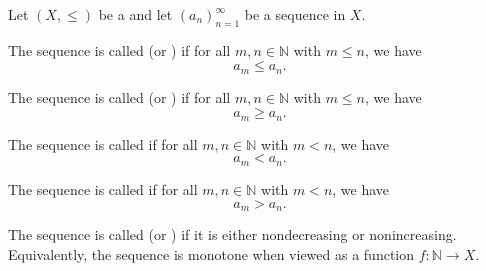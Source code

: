 \begin{definition} \label{definition:monotone_sequence_of_real_numbers}
    Let $(X, \leq)$ be a  and let $(a_n)_{n=1}^\infty$ be a sequence in $X$.

    The sequence is called  (or ) if for all $m, n \in \mathbb{N}$ with $m \leq n$, we have
    $$a_m \leq a_n.$$

    The sequence is called  (or ) if for all $m, n \in \mathbb{N}$ with $m \leq n$, we have
    $$a_m \geq a_n.$$

    The sequence is called  if for all $m, n \in \mathbb{N}$ with $m < n$, we have
    $$a_m < a_n.$$

    The sequence is called  if for all $m, n \in \mathbb{N}$ with $m < n$, we have
    $$a_m > a_n.$$

    The sequence is called  (or ) if it is either nondecreasing or nonincreasing. Equivalently, the sequence is monotone when viewed as a function $f : \mathbb{N} \to X$.
\end{definition}
